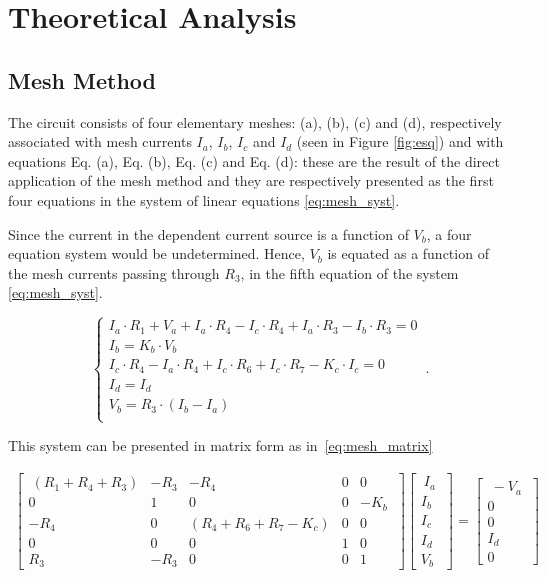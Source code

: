 \section{Theoretical Analysis}
\label{sec:analysis}

\subsection{Mesh Method}
\label{subsec:mesh}

The circuit consists of four elementary meshes: (a), (b), (c) and (d), respectively associated with mesh currents $I_a$, $I_b$, $I_c$ and $I_d$ (seen in Figure \ref{fig:esq}) and with equations Eq. (a), Eq. (b),  Eq. (c) and Eq. (d): these are the result of the direct application of the mesh method and they are respectively presented as the first four equations in the system of linear equations \ref{eq:mesh_syst}.

Since the current in the dependent current source is a function of $V_b$, a four equation system would be undetermined. Hence, $V_b$ is equated as a function of the mesh currents passing through $R_3$, in the fifth equation of the system \ref{eq:mesh_syst}. 

\begin{equation}
    \begin{cases}
      I_a \cdot R_1 + V_a + I_a \cdot R_4 - I_c \cdot R_4 + I_a \cdot R_3 - I_b \cdot R_3 = 0\\
      I_b = K_b \cdot V_b\\
      I_c \cdot R_4 - I_a \cdot R_4 + I_c \cdot R_6 + I_c \cdot R_7 - K_c \cdot I_c = 0\\
      I_d = I_d\\
      V_b = R_3 \cdot ( I_b - I_a )\\
    \end{cases}\,.
    \label{eq:mesh_syst}
\end{equation}

This system can be presented in matrix form as in~\ref{eq:mesh_matrix}

\begin{gather}
    \begin{bmatrix} 
      \ (R_1 + R_4 + R_3) & -R_3 & -R_4 & 0 & 0 \\ 0 & 1 & 0 & 0 & -K_b \ \\ -R_4 & 0 & (R_4 + R_6 + R_7 - K_c) & 0 & 0 \\ 0 & 0 & 0 & 1 & 0 \\ R_3 & -R_3 & 0 & 0 & 1
    \end{bmatrix}
    \begin{bmatrix}
      \ I_a \ \\ I_b \\ I_c \\ I_d \\ V_b 
    \end{bmatrix}
    =
    \begin{bmatrix}
      \ -V_a \ \\ 0 \\ 0 \\ I_d \\ 0 
    \end{bmatrix}
    \label{eq:mesh_matrix}
\end{gather}

